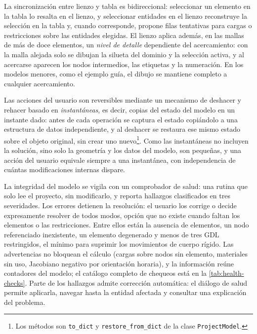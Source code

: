 La sincronización entre lienzo y tabla es bidireccional: seleccionar un elemento en la tabla lo resalta en el lienzo, y seleccionar entidades en el lienzo reconstruye la selección en la tabla y, cuando corresponde, propone filas tentativas para cargas o restricciones sobre las entidades elegidas. El lienzo aplica además, en las mallas de más de doce elementos, un \emph{nivel de detalle} dependiente del acercamiento: con la malla alejada solo se dibujan la silueta del dominio y la selección activa, y al acercarse aparecen los nodos intermedios, las etiquetas y la numeración. En los modelos menores, como el ejemplo guía, el dibujo se mantiene completo a cualquier acercamiento.

Las acciones del usuario son reversibles mediante un mecanismo de deshacer y rehacer basado en \emph{instantáneas}, es decir, copias del estado del modelo en un instante dado: antes de cada operación se captura el estado copiándolo a una estructura de datos independiente, y al deshacer se restaura ese mismo estado sobre el objeto original, sin crear uno nuevo\footnote{Los métodos son \texttt{to\_dict} y \texttt{restore\_from\_dict} de la clase \texttt{ProjectModel}.}. Como las instantáneas no incluyen la solución, sino solo la geometría y los datos del modelo, son pequeñas, y una acción del usuario equivale siempre a una instantánea, con independencia de cuántas modificaciones internas dispare.

La integridad del modelo se vigila con un comprobador de salud: una rutina que solo lee el proyecto, sin modificarlo, y reporta hallazgos clasificados en tres severidades. Los errores detienen la resolución: el usuario los corrige o decide expresamente resolver de todos modos, opción que no existe cuando faltan los elementos o las restricciones. Entre ellos están la ausencia de elementos, un nodo referenciado inexistente, un elemento degenerado y menos de tres GDL restringidos, el mínimo para suprimir los movimientos de cuerpo rígido. Las advertencias no bloquean el cálculo (cargas sobre nodos sin elemento, materiales sin uso, Jacobiano negativo por orientación horaria), y la información reúne contadores del modelo; el catálogo completo de chequeos está en la \autoref{tab:health-checks}. Parte de los hallazgos admite corrección automática: el diálogo de salud permite aplicarla, navegar hasta la entidad afectada y consultar una explicación del problema.

